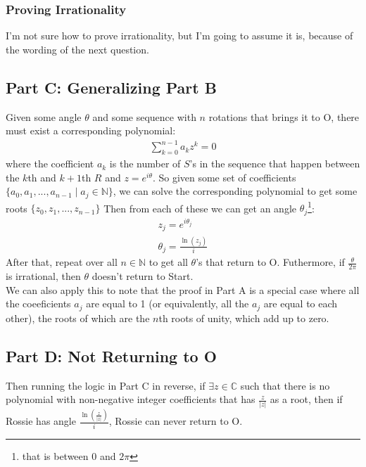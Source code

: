 \documentclass{article}
\begin{document}
  \subsubsection{Proving Irrationality}
  I'm not sure how to prove irrationality, but I'm going to assume it is, because of the wording of the next question.
  \subsection{Part C: Generalizing Part B}
  Given some angle $\theta$ and some sequence with $n$ rotations that brings it to O, there must exist a corresponding polynomial:
  \begin{align}
    \sum^{n-1}_{k=0}a_kz^k = 0
  \end{align}
  where the coefficient $a_k$ is the number of $S$'s in the sequence that happen between the $k$th and $k+1$th $R$ and $z = e^{i\theta}$. So given some set of coefficients $\{a_0, a_1, ..., a_{n-1} \mid a_j \in \mathbb{N}\}$, we can solve the corresponding polynomial to get some roots $\{z_0, z_1, ..., z_{n-1}\}$ Then from each of these we can get an angle $\theta_j$\footnote{that is between 0 and $2\pi$}:
  \begin{align}
    z_j = e^{i\theta_j}\\
    \theta_j = \frac{\ln(z_j)}{i}
  \end{align}
  After that, repeat over all $ n \in \mathbb{N}$ to get all $\theta$'s that return to O. Futhermore, if $\frac{\theta}{2\pi}$ is irrational, then $\theta$ doesn't return to Start.\\
  
  We can also apply this to note that the proof in Part A is a special case where all the coeeficients $a_j$ are equal to 1 (or equivalently, all the $a_j$ are equal to each other), the roots of which are the $n$th roots of unity, which add up to zero.
  \subsection{Part D: Not Returning to O}
  Then running the logic in Part C in reverse, if $\exists z \in \mathbb{C}$ such that there is no polynomial with non-negative integer coefficients that has $\frac{z}{\lvert z \rvert}$ as a root, then if Rossie has angle $\frac{\ln(\frac{z}{\lvert z \rvert})}{i}$, Rossie can never return to O.
\end{document}
